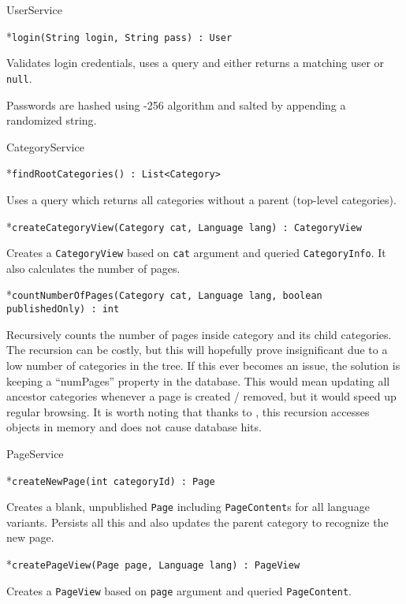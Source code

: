 \vfil \break

\secc UserService

\begitems

*{\tt login(String login, String pass) : User}

Validates login credentials, uses a  query and either returns a matching user or {\tt null}.

\enditems

Passwords are hashed using -256 algorithm and salted by appending a randomized string.

\secc CategoryService

\begitems

*{\tt findRootCategories() : List<Category>}

Uses a  query which returns all categories without a parent (top-level categories).

*{\tt createCategoryView(Category cat, Language lang) : CategoryView}

Creates a {\tt CategoryView} based on {\tt cat} argument and queried {\tt CategoryInfo}. It also calculates the number of pages.

*{\tt countNumberOfPages(Category cat, Language lang, boolean publishedOnly) : int}

Recursively counts the number of pages inside category and its child categories. The recursion can be costly, but this will hopefully prove insignificant due to a low number of categories in the tree. If this ever becomes an issue, the solution is keeping a “numPages” property in the database. This would mean updating all ancestor categories whenever a page is created / removed, but it would speed up regular browsing. It is worth noting that thanks to , this recursion accesses objects in memory and does not cause database hits.

\enditems

\secc PageService

\begitems

*{\tt createNewPage(int categoryId) : Page}

Creates a blank, unpublished {\tt Page} including {\tt PageContent}s for all language variants. Persists all this and also updates the parent category to recognize the new page.

*{\tt createPageView(Page page, Language lang) : PageView}

Creates a {\tt PageView} based on {\tt page} argument and queried {\tt PageContent}.

